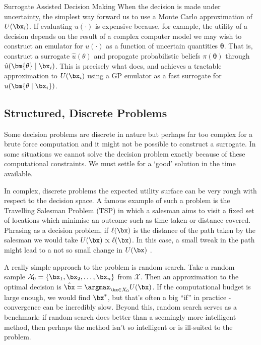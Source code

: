 \begin{chapter}{Surrogate Assisted Decision Making \label{Chap:optimisation}}
When the decision is made under uncertainty, the simplest way forward us to use a Monte Carlo approximation of $U(\bx_i)$. If evaluating $u(\cdot)$ is expensive because, for example, the utility of a decision depends on the result of a complex computer model we may wish to construct an emulator for $u(\cdot)$ as a function of uncertain quantities $\bm{\theta}$. That is, construct a surrogate $\hat{u}(\theta)$ and propagate probabilistic beliefs $\pi(\bm{\theta})$ through $\hat{u}(\bm{\theta} \mid \bx_i)$. This is precisely what \citet{Oakley2009} does, and achieves a tractable approximation to $U(\bx_i)$ using a GP emulator as a fast surrogate for $u(\bm{\theta \mid \bx_i})$.

\subsection{Structured, Discrete Problems}

Some decision problems are discrete in nature but perhaps far too complex for a brute force computation and it might not be possible to construct a surrogate. In some situations we cannot solve the decision problem exactly because of these computational constraints. We must settle for a `good' solution in the time available.

In complex, discrete problems the expected utility surface can be very rough with respect to the decision space. A famous example of such a problem is the Travelling Salesman Problem (TSP) in which a salesman aims to visit a fixed set of locations which minimise an outcome such as time taken or distance covered. Phrasing as a decision problem, if $\ell(\bx)$ is the distance of the path taken by the salesman we would take $U(\bx) \propto \ell(\bx)$. In this case, a small tweak in the path might lead to a not so small change in $U(\bx)$ \citep{Gutin2007}.

A really simple approach to the problem is random search. Take a random sample $\mathcal{X}_0 = \{ \bx_1, \bx_2, \ldots, \bx_n\}$ from $\mathcal{X}$. Then an approximation to the optimal decision is $\hat{\bx} = \argmax_{\bx \in X_0} U(\bx)$. If the computational budget is large enough, we would find $\bx^{*}$, but that's often a big ``if'' in practice - convergence can be incredibly slow. Beyond this, random search serves as a benchmark: if random search does better than a seemingly more intelligent method, then perhaps the method isn't so intelligent or is ill-suited to the problem.


\end{chapter}
